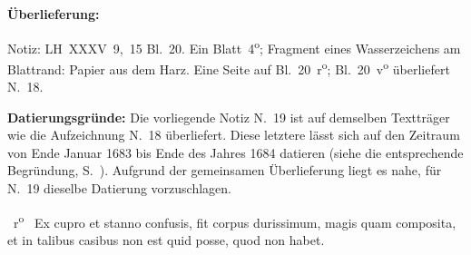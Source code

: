%
%
%
%
%
\frenchspacing%
%
\begin{ledgroupsized}[r]{120mm}
\footnotesize
\pstart
\noindent\textbf{Überlieferung:}
\pend
\end{ledgroupsized}
\begin{ledgroupsized}[r]{114mm}
\footnotesize
\pstart \parindent -6mm
%
Notiz: LH~XXXV~9,~15 Bl.~20.
Ein Blatt~4\textsuperscript{o};
Fragment eines Wasserzeichens am Blatt\-rand:
Papier aus dem Harz.
Eine Seite auf Bl.~20~r\textsuperscript{o};
Bl.~20~v\textsuperscript{o} überliefert N.~18.
\pend
\end{ledgroupsized}
%
%
\vspace*{5mm}
\begin{ledgroup}
\footnotesize
\pstart
\noindent%
\textbf{Datierungsgründe:}
Die vorliegende Notiz N.~19 ist auf demselben Textträger wie die Aufzeichnung N.~18 überliefert.
Diese letztere lässt sich auf den Zeitraum von Ende Januar 1683 bis Ende des Jahres 1684 datieren (siehe die entsprechende Begründung, S.~\pageref{LH_35_09_15_020v_Datierung}).
Aufgrund der gemeinsamen Überlieferung liegt es nahe, für N.~19 dieselbe Datierung vorzuschlagen.
\pend
\end{ledgroup}
%
%
%
\frenchspacing%
%
%
\vspace*{8mm}
\pstart%
\normalsize%
\noindent%
%
~r\textsuperscript{o}\rbrack\ %
%
Ex cupro\protect{} et stanno\protect{} confusis,
fit corpus durissimum,\protect{}
magis quam composita,\protect{}
et in talibus casibus\protect{} non est
quid posse,
quod non habet.
\pend%
%
\pstart%
